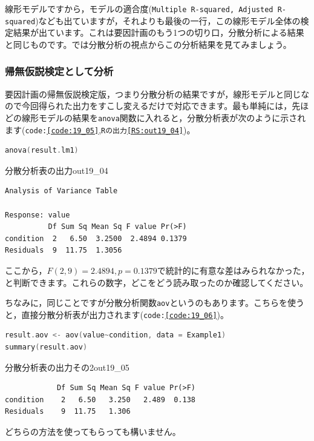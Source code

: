 \documentclass{ltjbook}
\begin{document}
線形モデルですから，モデルの適合度(\texttt{Multiple R-squared, Adjusted R-squared})なども出ていますが，それよりも最後の一行，この線形モデル全体の検定結果が出ています。これは要因計画のもう1つの切り口，分散分析による結果と同じものです。では分散分析の視点からこの分析結果を見てみましょう。

\subsubsection{帰無仮説検定として分析}
要因計画の帰無仮説検定版，つまり分散分析の結果ですが，線形モデルと同じなので今回得られた出力をすこし変えるだけで対応できます。最も単純には，先ほどの線形モデルの結果を\texttt{anova}関数に入れると，分散分析表が次のように示されます(\texttt{code:\ref{code:19_05}},\texttt{Rの出力\ref{RS:out19_04}})。


\begin{lstlisting}[language=c++,label={code:19_05},caption={分散分析としてみる}]
anova(result.lm1)
\end{lstlisting}


\begin{Rscreen}{分散分析表の出力}{out19_04}
	\begin{verbatim}
Analysis of Variance Table

Response: value
          Df Sum Sq Mean Sq F value Pr(>F)
condition  2   6.50  3.2500  2.4894 0.1379
Residuals  9  11.75  1.3056   
\end{verbatim}
\end{Rscreen}

ここから，$F(2,9)=2.4894,p=0.1379$で統計的に有意な差はみられなかった，と判断できます。これらの数字，どこをどう読み取ったのか確認してください。

ちなみに，同じことですが分散分析関数\verb|aov|というのもあります。こちらを使うと，直接分散分析表が出力されます(\texttt{code:\ref{code:19_06}})。

\begin{lstlisting}[language=c++,label={code:19_06},caption={aov関数で実行する}]
result.aov <- aov(value~condition, data = Example1)
summary(result.aov)
\end{lstlisting}

\begin{Rscreen}{分散分析表の出力その2}{out19_05}
\begin{verbatim}
            Df Sum Sq Mean Sq F value Pr(>F)
condition    2   6.50   3.250   2.489  0.138
Residuals    9  11.75   1.306 
\end{verbatim}
\end{Rscreen}
どちらの方法を使ってもらっても構いません。
\end{document}
